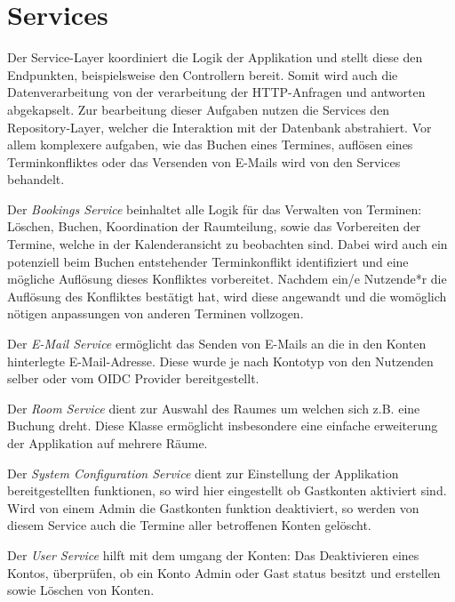 
\chapter{Services}
\label{ch:services}

Der Service-Layer koordiniert die Logik der Applikation und stellt diese den Endpunkten, beispielsweise den Controllern bereit.
Somit wird auch die Datenverarbeitung von der verarbeitung der HTTP-Anfragen und antworten abgekapselt.
Zur bearbeitung dieser Aufgaben nutzen die Services den Repository-Layer, welcher die Interaktion mit der Datenbank abstrahiert.
Vor allem komplexere aufgaben, wie das Buchen eines Termines, auflösen eines Terminkonfliktes oder das
Versenden von E-Mails wird von den Services behandelt.

Der \textit{Bookings Service} beinhaltet alle Logik für das Verwalten von Terminen: Löschen, Buchen, Koordination der Raumteilung, sowie das Vorbereiten der Termine, welche in der Kalenderansicht zu beobachten sind.
Dabei wird auch ein potenziell beim Buchen entstehender Terminkonflikt identifiziert und eine mögliche Auflösung dieses Konfliktes vorbereitet.
Nachdem ein/e Nutzende*r die Auflösung des Konfliktes bestätigt hat, wird diese angewandt und die womöglich nötigen anpassungen von anderen Terminen vollzogen.

Der \textit{E-Mail Service} ermöglicht das Senden von E-Mails an die in den Konten hinterlegte E-Mail-Adresse.
Diese wurde je nach Kontotyp von den Nutzenden selber oder vom \gls{OIDC} Provider bereitgestellt.

Der \textit{Room Service} dient zur Auswahl des Raumes um welchen sich z.B. eine Buchung dreht.
Diese Klasse ermöglicht insbesondere eine einfache erweiterung der Applikation auf mehrere Räume.

Der \textit{System Configuration Service} dient zur Einstellung der Applikation bereitgestellten funktionen, so wird hier eingestellt ob Gastkonten aktiviert sind.
Wird von einem Admin die Gastkonten funktion deaktiviert, so werden von diesem Service auch die Termine aller betroffenen Konten gelöscht.

Der \textit{User Service} hilft mit dem umgang der Konten: Das Deaktivieren eines Kontos, überprüfen, ob ein Konto Admin oder Gast status besitzt und erstellen sowie Löschen von Konten.


